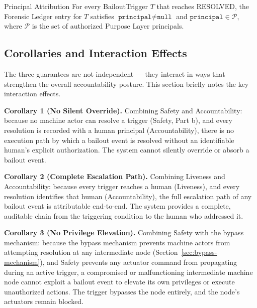 \begin{invariant}{Principal Attribution}
\label{inv:principal-attribution}
For every BailoutTrigger $T$ that reaches RESOLVED, the Forensic Ledger entry for $T$ satisfies $\texttt{principal} \neq \texttt{null}$ and $\texttt{principal} \in \mathcal{P}$, where $\mathcal{P}$ is the set of authorized Purpose Layer principals.
\end{invariant}

\subsection{Corollaries and Interaction Effects}
\label{sec:guarantee-corollaries}

The three guarantees are not independent — they interact in ways that strengthen the overall accountability posture. This section briefly notes the key interaction effects.

\bigskip

\noindent\textbf{Corollary 1 (No Silent Override).} Combining Safety and Accountability: because no machine actor can resolve a trigger (Safety, Part b), and every resolution is recorded with a human principal (Accountability), there is no execution path by which a bailout event is resolved without an identifiable human's explicit authorization. The system cannot silently override or absorb a bailout event.

\medskip

\noindent\textbf{Corollary 2 (Complete Escalation Path).} Combining Liveness and Accountability: because every trigger reaches a human (Liveness), and every resolution identifies that human (Accountability), the full escalation path of any bailout event is attributable end-to-end. The system provides a complete, auditable chain from the triggering condition to the human who addressed it.

\medskip

\noindent\textbf{Corollary 3 (No Privilege Elevation).} Combining Safety with the bypass mechanism: because the bypass mechanism prevents machine actors from attempting resolution at any intermediate node (Section~\ref{sec:bypass-mechanism}), and Safety prevents any actuator command from propagating during an active trigger, a compromised or malfunctioning intermediate machine node cannot exploit a bailout event to elevate its own privileges or execute unauthorized actions. The trigger bypasses the node entirely, and the node's actuators remain blocked.

